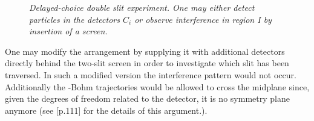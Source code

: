 \begin{figure}[t]
\begin{center}
\centerline{\epsfxsize=2.5in}
\vspace{-1.cm}
\caption[*]{\label{ds} {\em Delayed-choice double slit experiment. One may either detect particles in the detectors $C_i$
or observe interference in region I  by insertion of a screen.}}
\end{center}
\vspace{-0.8cm}
\end{figure}
One may modify the arrangement by supplying it
with additional detectors directly behind the two-slit screen in order to investigate 
which slit has been traversed. In such a modified version the interference pattern 
would not occur. Additionally the \db-Bohm trajectories would be allowed to cross the midplane
since, given the degrees of freedom related to the detector, it is no symmetry plane anymore
(see \cite{speakable}[p.111] for the details of this argument.).

